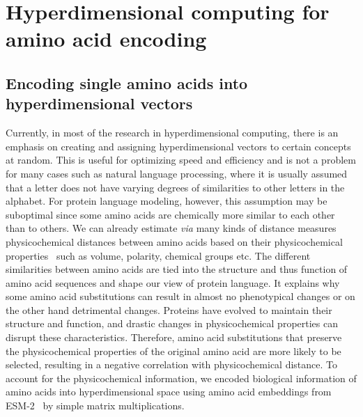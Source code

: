 \chapter{Hyperdimensional computing for amino acid encoding}
\section{Encoding single amino acids into hyperdimensional vectors}
Currently, in most of the research in hyperdimensional computing, there is an emphasis on creating and assigning hyperdimensional vectors to certain concepts at random. This is useful for optimizing speed and efficiency and is not a problem for many cases such as natural language processing, where it is usually assumed that a letter does not have varying degrees of similarities to other letters in the alphabet. For protein language modeling, however, this assumption may be suboptimal since some amino acids are chemically more similar to each other than to others. We can already estimate \textit{via} many kinds of distance measures physicochemical distances between amino acids based on their physicochemical properties~\cite{physicochem} such as volume, polarity, chemical groups etc. The different similarities between amino acids are tied into the structure and thus function of amino acid sequences and shape our view of protein language. It explains why some amino acid substitutions can result in almost no phenotypical changes or on the other hand detrimental changes. Proteins have evolved to maintain their structure and function, and drastic changes in physicochemical properties can disrupt these characteristics. Therefore, amino acid substitutions that preserve the physicochemical properties of the original amino acid are more likely to be selected, resulting in a negative correlation with physicochemical distance. To account for the physicochemical information, we encoded biological information of amino acids into hyperdimensional space using amino acid embeddings from ESM-2~\cite{esm2} by simple matrix multiplications.

